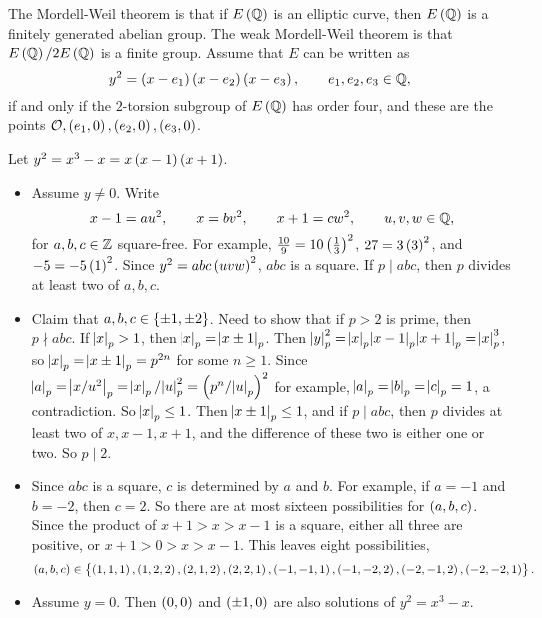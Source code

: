
The Mordell-Weil theorem is that if $ E\br{\QQ} $ is an elliptic curve, then $ E\br{\QQ} $ is a finitely generated abelian group. The weak Mordell-Weil theorem is that $ E\br{\QQ} / 2E\br{\QQ} $ is a finite group. Assume that $ E $ can be written as
$$ y^2 = \br{x - e_1}\br{x - e_2}\br{x - e_3}, \qquad e_1, e_2, e_3 \in \QQ, $$
if and only if the $ 2 $-torsion subgroup of $ E\br{\QQ} $ has order four, and these are the points $ \OOO, \br{e_1, 0}, \br{e_2, 0}, \br{e_3, 0} $.

\begin{example}
Let $ y^2 = x^3 - x = x\br{x - 1}\br{x + 1} $.
\begin{itemize}
\item Assume $ y \ne 0 $. Write
$$ x - 1 = au^2, \qquad x = bv^2, \qquad x + 1 = cw^2, \qquad u, v, w \in \mathbb{Q}, $$
for $ a, b, c \in \mathbb{Z} $ square-free. For example, $ \tfrac{10}{9} = 10\br{\tfrac{1}{3}}^2 $, $ 27 = 3\br{3}^2 $, and $ -5 = -5\br{1}^2 $. Since $ y^2 = abc\br{uvw}^2 $, $ abc $ is a square. If $ p \mid abc $, then $ p $ divides at least two of $ a, b, c $.
\item Claim that $ a, b, c \in \cbr{\pm 1, \pm 2} $. Need to show that if $ p > 2 $ is prime, then $ p \nmid abc $. If $ \abs{x}_p > 1 $, then $ \abs{x}_p = \abs{x \pm 1}_p $. Then $ \abs{y}_p^2 = \abs{x}_p\abs{x - 1}_p\abs{x + 1}_p = \abs{x}_p^3 $, so $ \abs{x}_p = \abs{x \pm 1}_p = p^{2n} $ for some $ n \ge 1 $. Since $ \abs{a}_p = \abs{x / u^2}_p = \abs{x}_p / \abs{u}_p^2 = \br{p^n / \abs{u}_p}^2 $ for example, $ \abs{a}_p = \abs{b}_p = \abs{c}_p = 1 $, a contradiction. So $ \abs{x}_p \le 1 $. Then $ \abs{x \pm 1}_p \le 1 $, and if $ p \mid abc $, then $ p $ divides at least two of $ x, x - 1, x + 1 $, and the difference of these two is either one or two. So $ p \mid 2 $.
\item Since $ abc $ is a square, $ c $ is determined by $ a $ and $ b $. For example, if $ a = -1 $ and $ b = -2 $, then $ c = 2 $. So there are at most sixteen possibilities for $ \br{a, b, c} $. Since the product of $ x + 1 > x > x - 1 $ is a square, either all three are positive, or $ x + 1 > 0 > x > x - 1 $. This leaves eight possibilities,
$$ \br{a, b, c} \in \cbr{\br{1, 1, 1}, \br{1, 2, 2}, \br{2, 1, 2}, \br{2, 2, 1}, \br{-1, -1, 1}, \br{-1, -2, 2}, \br{-2, -1, 2}, \br{-2, -2, 1}}. $$
\item Assume $ y = 0 $. Then $ \br{0, 0} $ and $ \br{\pm 1, 0} $ are also solutions of $ y^2 = x^3 - x $.
\begin{itemize}

\end{itemize}
\end{itemize}
\end{example}
